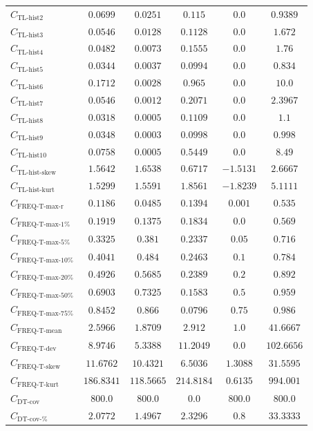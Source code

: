 \documentclass{standalone}
\newcommand{\tlhisttwoname}{\text{TL-hist2}}
\newcommand{\tlhisttwo}{C_{\tlhisttwoname}}
\newcommand{\tlhistthreename}{\text{TL-hist3}}
\newcommand{\tlhistthree}{C_{\tlhistthreename}}
\newcommand{\tlhistfourname}{\text{TL-hist4}}
\newcommand{\tlhistfour}{C_{\tlhistfourname}}
\newcommand{\tlhistfivename}{\text{TL-hist5}}
\newcommand{\tlhistfive}{C_{\tlhistfivename}}
\newcommand{\tlhistsixname}{\text{TL-hist6}}
\newcommand{\tlhistsix}{C_{\tlhistsixname}}
\newcommand{\tlhistsevenname}{\text{TL-hist7}}
\newcommand{\tlhistseven}{C_{\tlhistsevenname}}
\newcommand{\tlhisteightname}{\text{TL-hist8}}
\newcommand{\tlhisteight}{C_{\tlhisteightname}}
\newcommand{\tlhistninename}{\text{TL-hist9}}
\newcommand{\tlhistnine}{C_{\tlhistninename}}
\newcommand{\tlhisttenname}{\text{TL-hist10}}
\newcommand{\tlhistten}{C_{\tlhisttenname}}
\newcommand{\tlskewhistname}{\text{TL-hist-skew}}
\newcommand{\tlskewhist}{C_{\tlskewhistname}}
\newcommand{\tlkurthistname}{\text{TL-hist-kurt}}
\newcommand{\tlkurthist}{C_{\tlkurthistname}}
\newcommand{\freqmaxrname}{\text{FREQ-T-max-r}}
\newcommand{\freqmaxr}{C_{\freqmaxrname}}
\newcommand{\freqmaxonename}{\text{FREQ-T-max-1\%}}
\newcommand{\freqmaxone}{C_{\freqmaxonename}}
\newcommand{\freqmaxfivename}{\text{FREQ-T-max-5\%}}
\newcommand{\freqmaxfive}{C_{\freqmaxfivename}}
\newcommand{\freqmaxtenname}{\text{FREQ-T-max-10\%}}
\newcommand{\freqmaxten}{C_{\freqmaxtenname}}
\newcommand{\freqmaxtwentyname}{\text{FREQ-T-max-20\%}}
\newcommand{\freqmaxtwenty}{C_{\freqmaxtwentyname}}
\newcommand{\freqmaxfiftyname}{\text{FREQ-T-max-50\%}}
\newcommand{\freqmaxfifty}{C_{\freqmaxfiftyname}}
\newcommand{\freqmaxseventyfivename}{\text{FREQ-T-max-75\%}}
\newcommand{\freqmaxseventyfive}{C_{\freqmaxseventyfivename}}
\newcommand{\freqmeanname}{\text{FREQ-T-mean}}
\newcommand{\freqmean}{C_{\freqmeanname}}
\newcommand{\freqdevname}{\text{FREQ-T-dev}}
\newcommand{\freqdev}{C_{\freqdevname}}
\newcommand{\freqskewname}{\text{FREQ-T-skew}}
\newcommand{\freqskew}{C_{\freqskewname}}
\newcommand{\freqkurtname}{\text{FREQ-T-kurt}}
\newcommand{\freqkurt}{C_{\freqkurtname}}
\newcommand{\dtcovname}{\text{DT-cov}}
\newcommand{\dtcov}{C_{\dtcovname}}
\newcommand{\dtrelcovname}{\text{DT-cov-\%}}
\newcommand{\dtrelcov}{C_{\dtrelcovname}}
\begin{document}
\begin{tabular}{lccccc}
$\tlhisttwo$ & $0.0699$ & $0.0251$ & $0.115$ & $0.0$ & $0.9389$ \\ 
$\tlhistthree$ & $0.0546$ & $0.0128$ & $0.1128$ & $0.0$ & $1.672$ \\ 
$\tlhistfour$ & $0.0482$ & $0.0073$ & $0.1555$ & $0.0$ & $1.76$ \\ 
$\tlhistfive$ & $0.0344$ & $0.0037$ & $0.0994$ & $0.0$ & $0.834$ \\ 
$\tlhistsix$ & $0.1712$ & $0.0028$ & $0.965$ & $0.0$ & $10.0$ \\ 
$\tlhistseven$ & $0.0546$ & $0.0012$ & $0.2071$ & $0.0$ & $2.3967$ \\ 
$\tlhisteight$ & $0.0318$ & $0.0005$ & $0.1109$ & $0.0$ & $1.1$ \\ 
$\tlhistnine$ & $0.0348$ & $0.0003$ & $0.0998$ & $0.0$ & $0.998$ \\ 
$\tlhistten$ & $0.0758$ & $0.0005$ & $0.5449$ & $0.0$ & $8.49$ \\ 
$\tlskewhist$ & $1.5642$ & $1.6538$ & $0.6717$ & $-1.5131$ & $2.6667$ \\ 
$\tlkurthist$ & $1.5299$ & $1.5591$ & $1.8561$ & $-1.8239$ & $5.1111$ \\ 
$\freqmaxr$ & $0.1186$ & $0.0485$ & $0.1394$ & $0.001$ & $0.535$ \\ 
$\freqmaxone$ & $0.1919$ & $0.1375$ & $0.1834$ & $0.0$ & $0.569$ \\ 
$\freqmaxfive$ & $0.3325$ & $0.381$ & $0.2337$ & $0.05$ & $0.716$ \\ 
$\freqmaxten$ & $0.4041$ & $0.484$ & $0.2463$ & $0.1$ & $0.784$ \\ 
$\freqmaxtwenty$ & $0.4926$ & $0.5685$ & $0.2389$ & $0.2$ & $0.892$ \\ 
$\freqmaxfifty$ & $0.6903$ & $0.7325$ & $0.1583$ & $0.5$ & $0.959$ \\ 
$\freqmaxseventyfive$ & $0.8452$ & $0.866$ & $0.0796$ & $0.75$ & $0.986$ \\ 
$\freqmean$ & $2.5966$ & $1.8709$ & $2.912$ & $1.0$ & $41.6667$ \\ 
$\freqdev$ & $8.9746$ & $5.3388$ & $11.2049$ & $0.0$ & $102.6656$ \\ 
$\freqskew$ & $11.6762$ & $10.4321$ & $6.5036$ & $1.3088$ & $31.5595$ \\ 
$\freqkurt$ & $186.8341$ & $118.5665$ & $214.8184$ & $0.6135$ & $994.001$ \\ 
$\dtcov$ & $800.0$ & $800.0$ & $0.0$ & $800.0$ & $800.0$ \\ 
$\dtrelcov$ & $2.0772$ & $1.4967$ & $2.3296$ & $0.8$ & $33.3333$ \\ 

\end{tabular}
\end{document}

